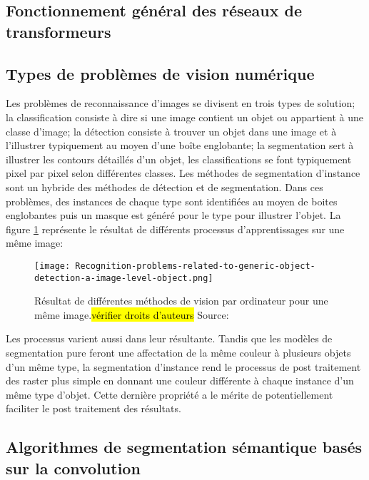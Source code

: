   \subsection{Fonctionnement général des réseaux de transformeurs}

  \subsection{Types de problèmes de vision numérique}
    Les problèmes de reconnaissance d'images se divisent en trois types de solution; la classification consiste à dire si une image contient un objet ou appartient à une classe d'image; la détection consiste à trouver un objet dans une image et à l'illustrer typiquement au moyen d'une boîte englobante; la segmentation sert à illustrer les contours détaillés d'un objet, les classifications se font typiquement pixel par pixel selon différentes classes. Les méthodes de segmentation d'instance sont un hybride des méthodes de détection et de segmentation. Dans ces problèmes, des instances de chaque type sont identifiées au moyen de boites englobantes puis un masque est généré pour le type pour illustrer l'objet. La figure \ref{fig:computer_vision_problems} représente le résultat de différents processus d'apprentissages sur une même image:
  \begin{figure}[!h]
    \centering
    \texttt{[image: Recognition-problems-related-to-generic-object-detection-a-image-level-object.png]}
    \caption{Résultat de différentes méthodes de vision par ordinateur pour une même image.\hl{vérifier droits d'auteurs} Source: \cite{Minaee:ImageSegmentation:2022}}
    \label{fig:computer_vision_problems}
  \end{figure}
  Les processus varient aussi dans leur résultante. Tandis que les modèles de segmentation pure feront une affectation de la même couleur à plusieurs objets d'un même type, la segmentation d'instance rend le processus de post traitement des raster plus simple en donnant une couleur différente à chaque instance d'un même type d'objet. Cette dernière propriété a le mérite de potentiellement faciliter le post traitement des résultats.
  \subsection{Algorithmes de segmentation sémantique basés sur la convolution}

